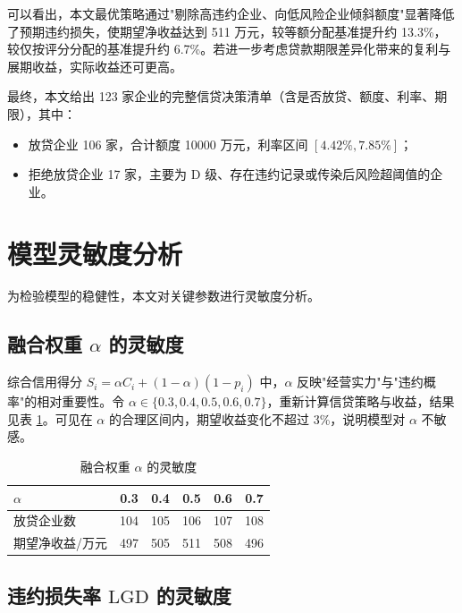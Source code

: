 \documentclass[12pt]{ctexart}
\begin{document}
可以看出，本文最优策略通过"剔除高违约企业、向低风险企业倾斜额度"显著降低了预期违约损失，使期望净收益达到 511 万元，较等额分配基准提升约 13.3\%，较仅按评分分配的基准提升约 6.7\%。若进一步考虑贷款期限差异化带来的复利与展期收益，实际收益还可更高。

最终，本文给出 123 家企业的完整信贷决策清单（含是否放贷、额度、利率、期限），其中：
\begin{itemize}[itemsep=1pt]
    \item 放贷企业 106 家，合计额度 10000 万元，利率区间 $[4.42\%, 7.85\%]$；
    \item 拒绝放贷企业 17 家，主要为 D 级、存在违约记录或传染后风险超阈值的企业。
\end{itemize}

\section{模型灵敏度分析}

为检验模型的稳健性，本文对关键参数进行灵敏度分析。

\subsection{融合权重 $\alpha$ 的灵敏度}

综合信用得分 $S_i=\alpha C_i+(1-\alpha)(1-p_i)$ 中，$\alpha$ 反映"经营实力"与"违约概率"的相对重要性。令 $\alpha\in\{0.3,0.4,0.5,0.6,0.7\}$，重新计算信贷策略与收益，结果见表 \ref{tab:sens1}。可见在 $\alpha$ 的合理区间内，期望收益变化不超过 3\%，说明模型对 $\alpha$ 不敏感。

\begin{table}[H]
\centering
\caption{融合权重 $\alpha$ 的灵敏度}
\label{tab:sens1}
\small
\begin{tabular}{lccccc}
\toprule
$\alpha$ & 0.3 & 0.4 & 0.5 & 0.6 & 0.7 \\
\midrule
放贷企业数 & 104 & 105 & 106 & 107 & 108 \\
期望净收益/万元 & 497 & 505 & 511 & 508 & 496 \\
\bottomrule
\end{tabular}
\end{table}

\subsection{违约损失率 $\mathrm{LGD}$ 的灵敏度}
\end{document}
